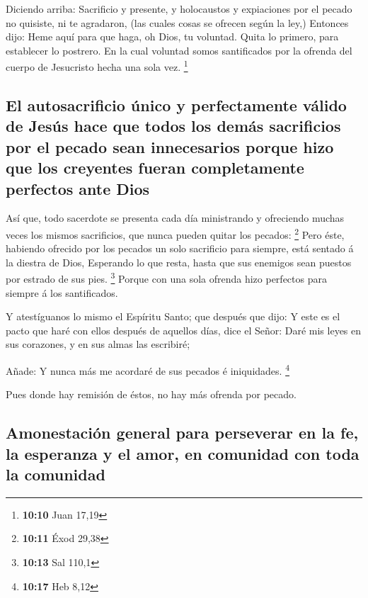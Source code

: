  Diciendo arriba: Sacrificio y presente, y holocaustos y
expiaciones por el pecado no quisiste, ni te agradaron, (las cuales
cosas se ofrecen según la ley,)  Entonces dijo: Heme aquí
para que haga, oh Dios, tu voluntad. Quita lo primero, para establecer
lo postrero.  En la cual voluntad somos santificados por la
ofrenda del cuerpo de Jesucristo hecha una sola vez. \footnote{\textbf{10:10}
  Juan 17,19}

\hypertarget{el-autosacrificio-uxfanico-y-perfectamente-vuxe1lido-de-jesuxfas-hace-que-todos-los-demuxe1s-sacrificios-por-el-pecado-sean-innecesarios-porque-hizo-que-los-creyentes-fueran-completamente-perfectos-ante-dios}{%
\subsection{El autosacrificio único y perfectamente válido de Jesús hace
que todos los demás sacrificios por el pecado sean innecesarios porque
hizo que los creyentes fueran completamente perfectos ante
Dios}\label{el-autosacrificio-uxfanico-y-perfectamente-vuxe1lido-de-jesuxfas-hace-que-todos-los-demuxe1s-sacrificios-por-el-pecado-sean-innecesarios-porque-hizo-que-los-creyentes-fueran-completamente-perfectos-ante-dios}}

 Así que, todo sacerdote se presenta cada día ministrando y
ofreciendo muchas veces los mismos sacrificios, que nunca pueden quitar
los pecados: \footnote{\textbf{10:11} Éxod 29,38}  Pero
éste, habiendo ofrecido por los pecados un solo sacrificio para siempre,
está sentado á la diestra de Dios,  Esperando lo que resta,
hasta que sus enemigos sean puestos por estrado de sus pies. \footnote{\textbf{10:13}
  Sal 110,1}  Porque con una sola ofrenda hizo perfectos
para siempre á los santificados.

 Y atestíguanos lo mismo el Espíritu Santo; que después que
dijo:  Y este es el pacto que haré con ellos después de
aquellos días, dice el Señor: Daré mis leyes en sus corazones, y en sus
almas las escribiré;

 Añade: Y nunca más me acordaré de sus pecados é
iniquidades. \footnote{\textbf{10:17} Heb 8,12}

 Pues donde hay remisión de éstos, no hay más ofrenda por
pecado.

\hypertarget{amonestaciuxf3n-general-para-perseverar-en-la-fe-la-esperanza-y-el-amor-en-comunidad-con-toda-la-comunidad}{%
\subsection{Amonestación general para perseverar en la fe, la esperanza
y el amor, en comunidad con toda la
comunidad}\label{amonestaciuxf3n-general-para-perseverar-en-la-fe-la-esperanza-y-el-amor-en-comunidad-con-toda-la-comunidad}}

